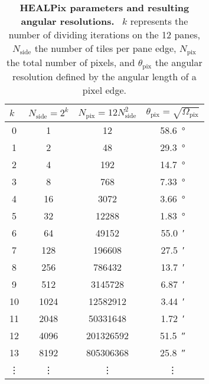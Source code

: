 \begin{table}[H]
\centering
\begin{tabular}{S[table-format=2.0]|S[table-format=4.0]|S[table-format=9.0]|S[table-format=2.2]}
 &  &  &  \\
  & 1    & 12        &  \SI{58.6}{\degree}\\
1  & 2    & 48        &  \SI{29.3}{\degree}\\
2  & 4    & 192       &  \SI{14.7}{\degree}\\
3  & 8    & 768 	  &  \SI{7.33}{\degree}\\
4  & 16   & 3072      &  \SI{3.66}{\degree}\\
5  & 32   & 12288     &  \SI{1.83}{\degree}\\
6  & 64   & 49152     &  \SI{55.0}{\arcminute}\\
7  & 128  & 196608    &  \SI{27.5}{\arcminute}\\
8  & 256  & 786432    &  \SI{13.7}{\arcminute}\\
9  & 512  & 3145728   &  \SI{6.87}{\arcminute}\\
10 & 1024 & 12582912  &  \SI{3.44}{\arcminute}\\
11 & 2048 & 50331648  &  \SI{1.72}{\arcminute}\\
12 & 4096 & 201326592 &  \SI{51.5}{\arcsecond}\\
13 & 8192 & 805306368 &  \SI{25.8}{\arcsecond}\\
 &  &  &  \\
\end{tabular}
\caption[HEALPix parameters and resulting angular resolutions]{\textbf{HEALPix parameters and resulting angular resolutions.}~\cite{healpix:paper} $k$ represents the number of dividing iterations on the 12 panes, $N_\text{side}$ the number of tiles per pane edge, $N_\text{pix}$ the total number of pixels, and $\theta_\text{pix}$ the angular resolution defined by the angular length of a pixel edge.}
\label{healpix:table}
\end{table}

